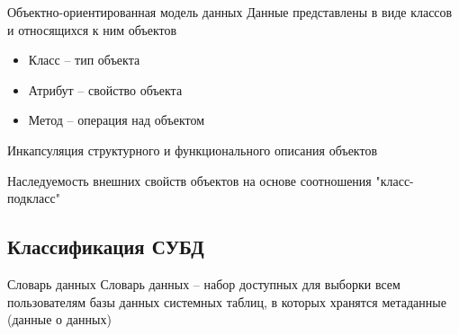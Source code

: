 \documentclass[12pt]{article}
\begin{document}
\begin{defin}{Объектно-ориентированная модель данных}
    Данные представлены в виде классов и относящихся к ним объектов 

    \begin{itemize}
        \item Класс -- тип объекта 
        \item Атрибут -- свойство объекта 
        \item Метод -- операция над объектом 
    \end{itemize}

    Инкапсуляция структурного и функционального описания объектов 

    Наследуемость внешних свойств объектов на основе соотношения "класс-подкласс"\
\end{defin}

\newpage 

\subsection{Классификация СУБД}

\begin{defin}{Словарь данных}
    Словарь данных -- набор доступных для выборки всем пользователям базы данных системных таблиц, в которых хранятся метаданные (данные о данных)
\end{defin}
\end{document}

